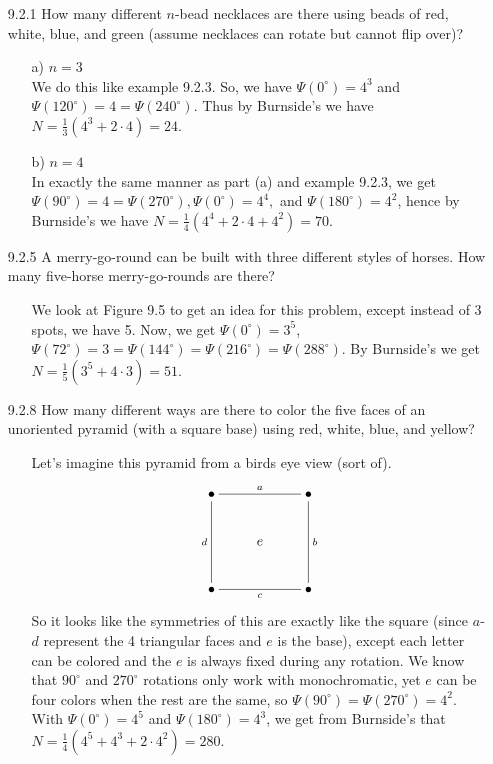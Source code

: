 \documentclass[12pt]{article}
\begin{document}
\begin{enumerate}
\item[9.2.1] How many different $n$-bead necklaces are there using beads of red, white, blue, and green (assume necklaces can rotate but cannot flip over)?
\begin{enumerate}
\item[a)] $n = 3$ \\
We do this like example 9.2.3. So, we have $\Psi (0^{\circ}) = 4^3$ and 
$\Psi (120^{\circ}) = 4 = \Psi(240^{\circ})$. Thus by Burnside's we have
$N = \frac{1}{3}(4^3 + 2 \cdot 4) = 24$.
\item[b)] $n = 4$ \\
In exactly the same manner as part (a) and example 9.2.3, we get
$\Psi (90^{\circ}) = 4 = \Psi(270^{\circ}), \Psi(0^{\circ}) = 4^4,$ and 
$\Psi(180^{\circ}) = 4^2$, hence by Burnside's we have
$N = \frac{1}{4}(4^4 + 2 \cdot 4 + 4^2) = 70$.
\end{enumerate}

\item[9.2.5] A merry-go-round can be built with three different styles of horses. How many five-horse merry-go-rounds are there?
\begin{enumerate}
\item[] We look at Figure 9.5 to get an idea for this problem, except instead of 3 spots, we
have 5. Now, we get 
$\Psi(0^{\circ}) = 3^5$,
$\Psi(72^{\circ}) = 3 = \Psi(144^{\circ}) = \Psi(216^{\circ}) = \Psi(288^{\circ})$.
By Burnside's we get $N = \frac{1}{5}(3^5 + 4 \cdot 3) = 51$.
\end{enumerate}

\item[9.2.8] How many different ways are there to color the five faces of an unoriented pyramid (with a square base) using red, white, blue, and yellow?
\begin{enumerate}
\item[] Let's imagine this pyramid from a birds eye view (sort of).
\begin{displaymath}
\xymatrix{
\bullet \ar@{-}[rr]^a \ar@{-}[dd]_d &&\bullet \ar@{-}[dd]^b \\
&e& \\
\bullet \ar@{-}[rr]_c &&\bullet
}
\end{displaymath}
So it looks like the symmetries of this are exactly like the square (since
$a$-$d$ represent the 4 triangular faces and $e$ is the base), except each letter
can be colored and the $e$ is always fixed during any rotation. We know that $90^{\circ}$ and
$270^{\circ}$ rotations only work with monochromatic, yet $e$ can be four colors when
the rest are the same, so $\Psi(90^{\circ}) = \Psi(270^{\circ}) = 4^2$. With
$\Psi(0^{\circ}) = 4^5$ and $\Psi(180^{\circ}) = 4^3$, we get from Burnside's that
$N = \frac{1}{4}(4^5 + 4^3 + 2 \cdot 4^2) = 280$.
\end{enumerate}


\end{enumerate}
\end{document}
